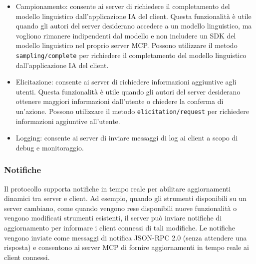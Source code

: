 \begin{itemize}
\item Campionamento: consente ai server di richiedere il completamento del modello linguistico dall'applicazione IA del client. Questa funzionalità è utile quando gli autori del server desiderano accedere a un modello linguistico, ma vogliono rimanere indipendenti dal modello e non includere un SDK del modello linguistico nel proprio server MCP. Possono utilizzare il metodo \texttt{sampling/complete} per richiedere il completamento del modello linguistico dall'applicazione IA del client.
\item Elicitazione: consente ai server di richiedere informazioni aggiuntive agli utenti. Questa funzionalità è utile quando gli autori del server desiderano ottenere maggiori informazioni dall'utente o chiedere la conferma di un'azione. Possono utilizzare il metodo \texttt{elicitation/request} per richiedere informazioni aggiuntive all'utente.
\item Logging: consente ai server di inviare messaggi di log ai client a scopo di debug e monitoraggio.
\cite{modelcontextprotocol2024arch}
\end{itemize}

\subsubsection{Notifiche}
Il protocollo supporta notifiche in tempo reale per abilitare aggiornamenti dinamici tra server e client. Ad esempio, quando gli strumenti disponibili su un server cambiano, come quando vengono rese disponibili nuove funzionalità o vengono modificati strumenti esistenti, il server può inviare notifiche di aggiornamento per informare i client connessi di tali modifiche. Le notifiche vengono inviate come messaggi di notifica JSON-RPC 2.0 (senza attendere una risposta) e consentono ai server MCP di fornire aggiornamenti in tempo reale ai client connessi.
\cite{modelcontextprotocol2024arch}
